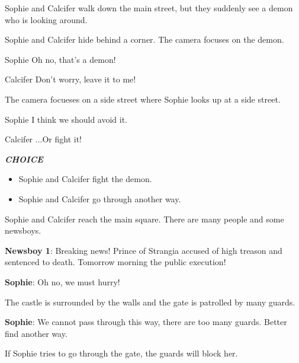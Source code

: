 
Sophie and Calcifer walk down the main street, but they suddenly see a demon who is looking around.

\begin{screenplay}

Sophie and Calcifer hide behind a corner. The camera focuses on the demon.

\begin{dialogue}[worried]{Sophie}
Oh no, that’s a demon!
\end{dialogue}
\begin{dialogue}[feisty]{Calcifer}
Don’t worry, leave it to me!
\end{dialogue}

The camera focueses on a side street where Sophie looks up at a side street.

\begin{dialogue}{Sophie}
I think we should avoid it.
\end{dialogue}

\begin{dialogue}{Calcifer}
...Or fight it!
\end{dialogue}
\end{screenplay}
\vspace{1em}

\textit{\textbf{CHOICE}}
\begin{itemize}
  \item Sophie and Calcifer fight the demon.
  \item Sophie and Calcifer go through another way.
\end{itemize}
  
Sophie and Calcifer reach the main square. There are many people and some newsboys.

\textbf{Newsboy 1}: Breaking news! Prince of Strangia accused of high treason and sentenced to death. Tomorrow morning the public execution!

\textbf{Sophie}: Oh no, we must hurry!

The castle is surrounded by the walls and the gate is patrolled by many guards.


\textbf{Sophie}: We cannot pass through this way, there are too many guards. Better find another way.

If Sophie tries to go through the gate, the guards will block her.

